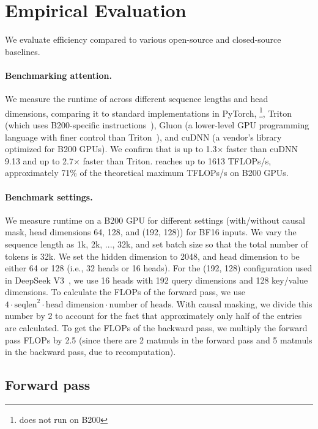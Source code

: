 \section{Empirical Evaluation}
\label{sec:experiments}

We evaluate \faf efficiency compared to various open-source and closed-source baselines.

\paragraph{Benchmarking attention.} We measure the runtime of \faf across different sequence lengths and head dimensions, comparing it to standard implementations in PyTorch, \faa\footnote{\fat does not run on B200}, Triton (which uses B200-specific instructions~\citep{tillet2019triton}), Gluon (a lower-level GPU programming language with finer control than Triton~\citep{gluon2024}), and cuDNN (a vendor's library optimized for B200 GPUs). We confirm that \faf is up to 1.3$\times$ faster than cuDNN 9.13 and up to 2.7$\times$ faster than Triton. \faf reaches up to 1613 TFLOPs/s, approximately 71\% of the theoretical maximum TFLOPs/s on B200 GPUs.

\paragraph{Benchmark settings.} We measure runtime on a B200 GPU for different settings (with/without causal mask, head dimensions 64, 128, and (192, 128)) for BF16 inputs. We vary the sequence length as 1k, 2k, ..., 32k, and set batch size so that the total number of tokens is 32k. We set the hidden dimension to 2048, and head dimension to be either 64 or 128 (i.e., 32 heads or 16 heads). For the (192, 128) configuration used in DeepSeek V3~\citep{deepseekai2024deepseekv3technicalreport}, we use 16 heads with 192 query dimensions and 128 key/value dimensions. To calculate the FLOPs of the forward pass, we use $4 \cdot \text{seqlen}^2 \cdot \text{head dimension} \cdot \text{number of heads}$.
With causal masking, we divide this number by 2 to account for the fact that approximately only half of the entries are calculated. To get the FLOPs of the backward pass, we multiply the forward pass FLOPs by 2.5 (since there are 2 matmuls in the forward pass and 5 matmuls in the backward pass, due to recomputation).

\subsection{Forward pass}

